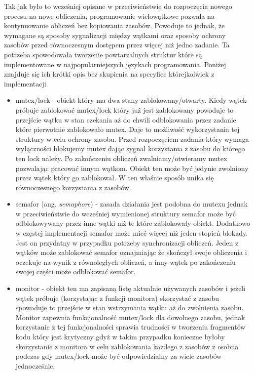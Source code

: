 Tak jak było to wcześniej opisane w przeciwieństwie do rozpoczęcia nowego procesu na nowe obliczenia, programowanie wielowątkowe pozwala na kontynuowanie obliczeń bez kopiowania zasobów. 
Powoduje to jednak, że wymagane są sposoby sygnalizacji między wątkami oraz sposoby ochrony zasobów przed równoczesnym dostępem przez więcej niż jedno zadanie. 
Ta potrzeba spowodowała tworzenie powtarzalnych struktur które są implementowane w najpopularniejszych językach programowania. 
Poniżej znajduje się ich krótki opis bez skupienia na specyfice którejkolwiek z implementacji. 
\begin{itemize}
        \item mutex/lock - obiekt który ma dwa stany zablokowany/otwarty.
        Kiedy wątek próbuje zablokować mutex/lock który już jest zablokowany powoduje to przejście wątku w stan czekania aż do chwili odblokowania przez zadanie które pierwotnie zablokowało mutex.
        Daje to możliwość wykorzystania tej struktury w celu ochrony zasobu. Przed rozpoczęciem zadania który wymaga wyłączności blokujemy mutex dając sygnał korzystania z zasobu do którego ten lock należy. 
        Po zakończeniu obliczeń zwalniamy/otwieramy mutex pozwalając pracować innym wątkom. Obiekt ten może być jedynie zwolniony przez wątek który go zablokował. 
        W ten właśnie sposób unika się równoczesnego korzystania z zasobów. 
        \item semafor (ang. \textit{semaphore}) - zasada działania jest podobna do mutexu jednak w przeciwieństwie do wcześniej wymienionej struktury semafor może być odblokowywany przez inne wątki niż te które zablokowały obiekt. Dodatkowo w częstej implementacji semafor może mieć więcej niż jeden stopień blokady. 
        Jest on przydatny w przypadku potrzeby synchronizacji obliczeń. Jeden z wątków może zablokować semafor oznajmiając że skończył swoje obliczenia i oczekuje na wynik z równoległych obliczeń, a inny wątek po zakończeniu swojej części może odblokować semafor. 
        \item monitor - obiekt ten ma zapisaną listę aktualnie używanych zasobów i jeżeli wątek próbuje (korzystając z funkcji monitora) skorzystać z zasobu spowoduje to przejście w stan wstrzymania wątku aż do zwolnienia zasobu. 
        Monitor zapewnia funkcjonalność mutex/lock dla dowolnego zasobu, jednak korzystanie z tej funkcjonalności sprawia trudności w tworzeniu fragmentów kodu który jest krytyczny gdyż w takim przypadku konieczne byłoby skorzystanie z monitora w celu zablokowania każdego z zasobów z osobna podczas gdy mutex/lock może być odpowiedzialny za wiele zasobów jednocześnie.   
\end{itemize} 

